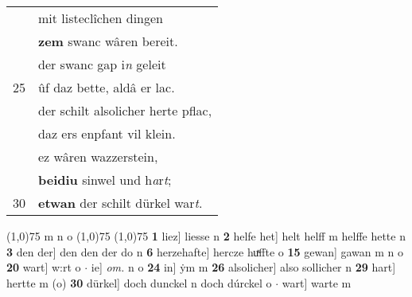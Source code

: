 \documentclass[8pt,a4paper,notitlepage]{article}
\begin{document}
\begin{table}[ht]
\begin{minipage}[t]{0.5\linewidth}
\begin{tabular}{rl}
 & mit listeclîchen dingen\\ 
 & \textbf{zem} swanc wâren bereit.\\ 
 & der swanc gap i\textit{n} geleit\\ 
25 & ûf daz bette, aldâ er lac.\\ 
 & der schilt alsolicher herte pflac,\\ 
 & daz ers enpfant vil klein.\\ 
 & ez wâren wazzerstein,\\ 
 & \textbf{beidiu} sinwel und h\textit{a}r\textit{t};\\ 
30 & \textbf{etwan} der schilt dürkel war\textit{t}.\\ 
\end{tabular}
\scriptsize
\line(1,0){75} \newline
m n o \newline
\line(1,0){75} \newline
\newline
\line(1,0){75} \newline
\textbf{1} liez] liesse n \textbf{2} helfe het] helt helff m helffe hette n \textbf{3} den der] den den der do n \textbf{6} herzehafte] hercze huͯffte o \textbf{15} gewan] gawan m n o \textbf{20} wart] w:rt o  $\cdot$ ie] \textit{om.} n o \textbf{24} in] ẏm m \textbf{26} alsolicher] also sollicher n \textbf{29} hart] hertte m (o) \textbf{30} dürkel] doch dunckel n doch dúrckel o  $\cdot$ wart] warte m \newline
\end{minipage}
\end{table}
\newpage
\end{document}
